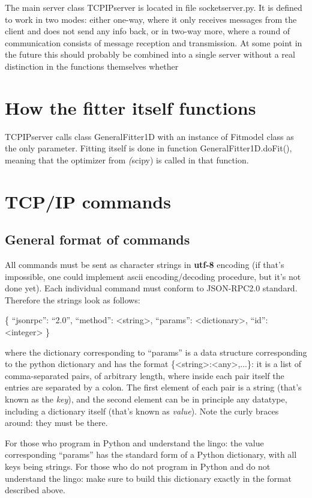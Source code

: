 \documentclass[11pt]{article} %
\begin{document}
The main server class { TCPIPserver} is located in file { socketserver.py}. It is defined to work in two modes: either one-way, where it only receives messages from the client and does not send any info back, or in two-way more, where a round of communication consists of message reception and transmission. { At some point in the future this should probably be combined into a single server without a real distinction in the functions themselves whether }

\section{How the fitter itself functions}

{ TCPIPserver} calls class { GeneralFitter1D} with an instance of { Fitmodel} class as the only parameter. Fitting itself is done in function { GeneralFitter1D.doFit()}, meaning that the optimizer from \textit(scipy) is called in that function.  

\section{TCP/IP commands}

\subsection{General format of commands}

All commands must be sent as character strings in \textbf{utf-8} encoding (if that's impossible, one could implement ascii encoding/decoding procedure, but it's not done yet). Each individual command must conform to JSON-RPC2.0 standard. Therefore the strings look as follows:

\begin{tcolorbox}[title=JSON-RPC2.0 command format]


{\selectfont \{ ``jsonrpc'': ``2.0'', ``method'': <string>, ``params'': <dictionary>, ``id'': <integer> \}}

where the dictionary corresponding to ``params'' is a data structure corresponding to the python dictionary and has the format \{<string>:<any>,...\}: it is a list of comma-separated pairs, of arbitrary length, where inside each pair itself the entries are separated by a colon. The first element of each pair is a string (that's known as the \textit{key}), and the second element can be in principle any datatype, including a dictionary itself (that's known as \textit{value}). Note the curly braces around: they must be there. 

For those who program in Python and understand the lingo: the value corresponding ``params'' has the standard form of a Python dictionary, with all keys being strings. For those who do not program in Python and do not understand the lingo: make sure to build this dictionary exactly in the format described above. 

\end{tcolorbox}
\end{document}
